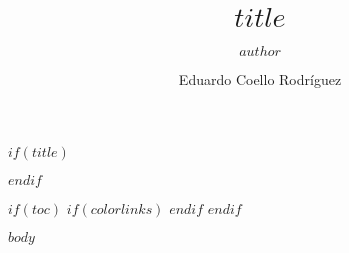 \documentclass[a4paper,11pt,hidelinks]{article}
\author{$author$}
\author{Eduardo Coello Rodríguez}
\date{}
\title{$title$}
\begin{document}
$if(title)$
\maketitle
$endif$

$if(toc)$
$if(colorlinks)$
\hypersetup{linkcolor=$if(toccolor)$$toccolor$$else$$endif$}
$endif$
\setcounter{tocdepth}{$toc-depth$}
\tableofcontents
$endif$

$body$
\end{document}
